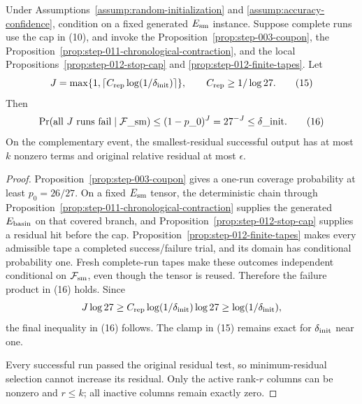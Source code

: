 \begin{proposition}\label{prop:step-012-restart}
Under Assumptions~\ref{assump:random-initialization} and
\ref{assump:accuracy-confidence}, condition on a fixed generated
\(E_{\rm sm}\) instance. Suppose complete runs use the cap in (10), and
invoke the Proposition~\ref{prop:step-003-coupon}, the Proposition~\ref{prop:step-011-chronological-contraction}, and the local
Propositions~\ref{prop:step-012-stop-cap} and
\ref{prop:step-012-finite-tapes}. Let
\[
 J=\max\{1,\lceil C_{\rm rep}\log(1/\delta_{\rm init})\rceil\},
 \qquad C_{\rm rep}\ge1/\log27.
\tag{15}
\]
Then
\[
 \Pr(\text{all \(J\) runs fail}\mid{\cal F}\_{\rm sm})
 \le(1-p\_0)^J=27^{-J}\le\delta\_{\rm init}.
\tag{16}
\]
On the complementary event, the smallest-residual successful output has at
most \(k\) nonzero terms and original relative residual at most \(\epsilon\).

\begin{proof}
Proposition~\ref{prop:step-003-coupon} gives a one-run coverage probability
at least \(p_0=26/27\). On a fixed \(E_{\rm sm}\) tensor, the deterministic chain through
Proposition~\ref{prop:step-011-chronological-contraction} supplies the
generated \(E_{\rm basin}\) on that covered branch, and
Proposition~\ref{prop:step-012-stop-cap} supplies a residual hit before the
cap. Proposition~\ref{prop:step-012-finite-tapes} makes every admissible tape
a completed success/failure trial, and its domain has conditional probability
one. Fresh complete-run tapes make these outcomes independent conditional on
\({\cal F}_{\rm sm}\), even though the tensor is reused. Therefore the
failure product in (16) holds. Since
\[
 J\log27\ge C_{\rm rep}\log(1/\delta_{\rm init})\log27
 \ge\log(1/\delta_{\rm init}),
\]
the final inequality in (16) follows. The clamp in (15) remains exact for
\(\delta_{\rm init}\) near one.

Every successful run passed the original residual test, so minimum-residual
selection cannot increase its residual. Only the active rank-\(r\) columns
can be nonzero and \(r\le k\); all inactive columns remain exactly zero.


\end{proof}
\end{proposition}

